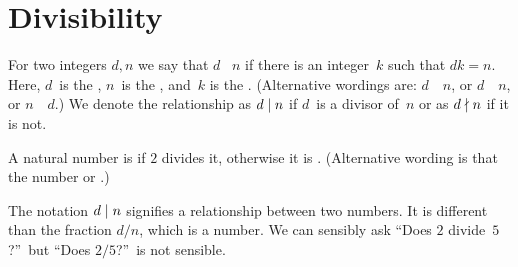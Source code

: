 \documentclass{ibl}
\begin{document}
\section{Divisibility}

\begin{df}
  For two integers $d,n$ we say that
  $d$ ~$n$
  if there is an integer~$k$ such that $dk=n$.
  Here, $d$~is the , 
  $n$~is the ,
  and~$k$ is the .
  (Alternative wordings are:
  $d$~~$n$,
  or $d$~~$n$,
  or $n$~~$d$.)
  We denote the relationship as
  $d\mid n$ if $d$~is a divisor of~$n$
  or as $d\nmid n$ if it is not.
\end{df}

\begin{df}
  A natural number is  if $2$ divides it,
  otherwise it is .
  (Alternative wording is that the number 
  or .)
\end{df}

The notation $d\mid n$ signifies a relationship between two numbers.
It is different than the fraction $d/n$, which is a number.
We can sensibly ask ``Does $2$ divide~$5$?''\
but ``Does $2/5$?''\ is not sensible.   
\end{document}
